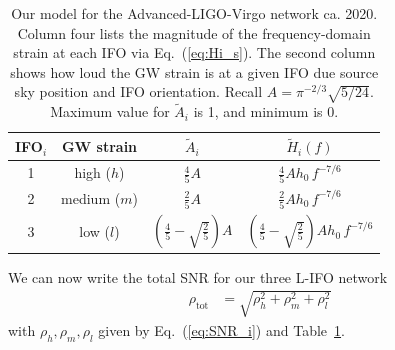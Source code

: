 \documentclass[prd,amsmath,amssymb,aps,floats,amsfonts,notitlepage,superscriptaddress,eqsecnum,nofootinbib,10pt]{revtex4-1}
\newcommand{\nn}{\nonumber}
\newcommand{\f}{\frac}
\newcommand\T{\rule{0pt}{2.6ex}}       %
\newcommand\B{\rule[-1.2ex]{0pt}{0pt}} %
\begin{document}
\begin{table}[h]
\centering
\begin{tabular}{c|c|c|c}
 IFO$_i$ & GW strain %
 & $\tilde{A}_i$ & $\tilde{H}_i(f)$\\
 \hline
 1 & high ($h$) &  $\tfrac{4}{5}A$ & $\tfrac{4}{5}A h_0\, f^{-7/6}$ \T\\
 2 & medium ($m$) & $\tfrac{2}{5}A$ & $ \tfrac{2}{5}A h_0 \, f^{-7/6}$\B\T \\
 3 & low ($l$)  & $\left(\tfrac{4}{5}-\sqrt{\tfrac{2}{5}}\right)A$ & $ \left(\tfrac{4}{5}-\sqrt{\tfrac{2}{5}}\right)A h_0 \, f^{-7/6}$\B \\
 \hline
\end{tabular}
\caption{%
Our model for the Advanced-LIGO-Virgo network ca. 2020. %
Column four lists the magnitude of the frequency-domain strain at each IFO via Eq.~(\ref{eq:Hi_s}).
The second column shows how loud the GW strain is at a given IFO due source sky position and IFO orientation. 
Recall $A= \pi^{-2/3} \sqrt{5/24}$. Maximum value for $\tilde{A}_i$ is 1, and minimum is 0.
}\label{table:network_params}
\end{table}
%
%
We can now write the total SNR for our three L-IFO network
%
\begin{align}
\rho_\text{tot} &= \sqrt{\rho^2_h+\rho^2_m+\rho^2_l} \label{eq:SNR_total_3IFOs} 
\end{align}
%
with $\rho_h, \rho_m,\rho_l$ given by Eq.~(\ref{eq:SNR_i}) and Table~\ref{table:network_params}.
%
\end{document}
